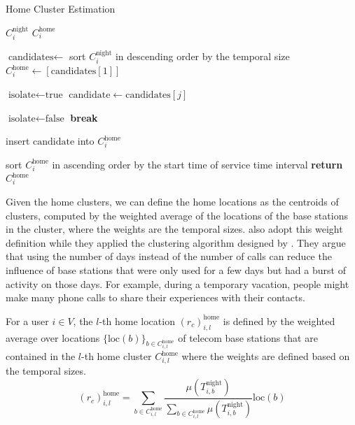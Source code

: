 \begin{algorithm}[h!]
\renewcommand{\algorithmicrequire}{\textbf{Input:}}
\renewcommand{\algorithmicensure}{\textbf{Output:}}
\caption{Home Cluster Estimation}
\label{home_cluster}
\begin{algorithmic}[1]
    \REQUIRE $C^\text{night}_i$
    \ENSURE $C^\text{home}_i$

    \STATE $\text{candidates} \leftarrow$ sort $C^\text{night}_i$ in descending order by the temporal size
    \STATE $C^\text{home}_i \leftarrow [\text{candidates}[1]]$
    \STATE

        \STATE $\text{isolate} \gets \text{true}$
        \STATE $\text{candidate} \gets \text{candidates}[j]$
        \STATE

                \STATE $\text{isolate} \gets \text{false}$
                \STATE \textbf{break}
            \ENDIF
        \ENDFOR
        \STATE

            \STATE insert $\text{candidate}$ into $C^\text{home}_i$
        \ENDIF
    \ENDFOR
    \STATE

    \STATE sort $C^\text{home}_i$ in ascending order by the start time of service time interval
    \STATE \textbf{return} $C^\text{home}_i$
\end{algorithmic}
\end{algorithm}


Given the home clusters, we can define the home locations as the centroids of clusters, computed by the weighted average of the locations of the base stations in the cluster, where the weights are the temporal sizes.
\cite{isaacman2011identifying} also adopt this weight definition while they applied the clustering algorithm designed by \cite{hartigan1975clustering}.
They argue that using the number of days instead of the number of calls can reduce the influence of base stations that were only used for a few days but had a burst of activity on those days.
For example, during a temporary vacation, people might make many phone calls to share their experiences with their contacts.


\begin{definition}
For a user $i \in V$, the $l$-th home location $(r_c)^{\text{home}}_{i, l}$ is defined by the weighted average over locations $\{\text{loc}(b)\}_{b \in C^{\text{home}}_{i, l}}$ of telecom base stations that are contained in the $l$-th home cluster $C^{\text{home}}_{i, l}$ where the weights are defined based on the temporal sizes.
\[
(r_c)^{\text{home}}_{i, l}
=
\sum_{b \in C^{\text{home}}_{i, l}}
    \frac{
        \mu(T^{\text{night}}_{i, b})
    }{
        \sum_{b \in C^{\text{home}}_{i, l}}
            \mu(T^{\text{night}}_{i, b})
    }
    \text{loc}(b)
\]
\end{definition}


